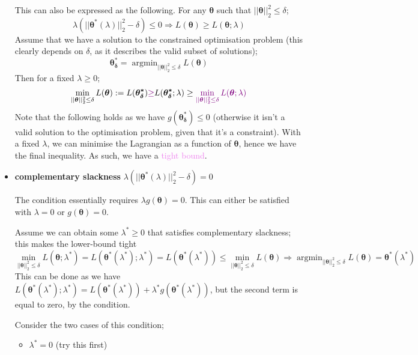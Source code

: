 \documentclass[a4paper, 12pt]{article}
\newcommand{\mat}[1]{\boldsymbol{#1}}
\DeclareMathOperator*{\argmin}{argmin}
\newcommand{\violet}[1]{\textcolor{violet}{#1}}
\begin{document}
\begin{itemize}
                        This can also be expressed as the following.
                        For any $\mat{\theta}$ such that $|| \mat{\theta} ||_2^2 \leq \delta$;
                        $$\lambda(|| \mat{\theta^*}(\lambda) ||_2^2 - \delta) \leq 0 \Rightarrow L(\mat{\theta}) \geq L(\mat{\theta}; \lambda)$$
                        Assume that we have a solution to the constrained optimisation problem (this clearly depends on $\delta$, as it describes the valid subset of solutions);
                        $$\mat{\theta_\delta^*} = \argmin_{|| \mat{\theta} ||_2^2 \leq \delta} L(\mat{\theta})$$
                        Then for a fixed $\lambda \geq 0$;
                        $$\min_{|| \mat{\theta} ||_2^2 \leq \delta} L(\mat{\theta}) := L(\mat{\theta_\delta^*}) \violet{\geq} L(\mat{\theta_\delta^*}; \lambda) \geq \violet{\min_{|| \mat{\theta} ||_2^2 \leq \delta} L(\mat{\theta}; \lambda)}$$
                        Note that the following holds as we have $g(\mat{\theta_\delta^*}) \leq 0$ (otherwise it isn't a valid solution to the optimisation problem, given that it's a constraint).
                        With a fixed $\lambda$, we can minimise the Lagrangian as a function of $\mat{\theta}$, hence we have the final inequality.
                        As such, we have a \violet{tight bound}.
                    \item \textbf{complementary slackness} \hfill $\lambda(|| \mat{\theta^*}(\lambda) ||_2^2 - \delta) = 0$
                        \smallskip

                        The condition essentially requires $\lambda g(\mat{\theta}) = 0$.
                        This can either be satisfied with $\lambda = 0$ or $g(\mat{\theta}) = 0$.
                        \medskip

                        Assume we can obtain some $\lambda^* \geq 0$ that satisfies complementary slackness; this makes the lower-bound tight
                        $$\min_{|| \mat{\theta} ||_2^2 \leq \delta} L(\mat{\theta}; \lambda^*) = L(\mat{\theta^*}(\lambda^*); \lambda^*) = L(\mat{\theta^*}(\lambda^*)) \leq \min_{|| \mat{\theta} ||_2^2 \leq \delta} L(\mat{\theta}) \Rightarrow \argmin_{|| \mat{\theta} ||_2^2 \leq \delta}L(\mat{\theta}) = \mat{\theta^*}(\lambda^*)$$
                        This can be done as we have $L(\mat{\theta^*}(\lambda^*); \lambda^*) = L(\mat{\theta^*}(\lambda^*)) + \lambda^* g(\mat{\theta^*}(\lambda^*))$, but the second term is equal to zero, by the condition.
                        \medskip

                        Consider the two cases of this condition;
                        \begin{itemize}
                            \itemsep0em
                            \item $\lambda^* = 0$ (try this first)
                                \smallskip


\end{itemize}
\end{itemize}
\end{document}
